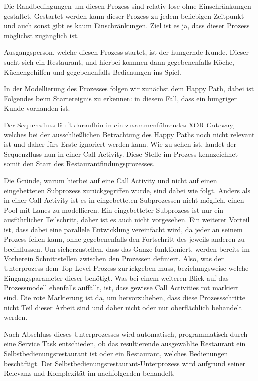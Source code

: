 Die Randbedingungen um diesen Prozess sind relativ lose ohne Einschränkungen gestaltet. Gestartet werden kann dieser Prozess zu jedem beliebigen Zeitpunkt und auch sonst gibt es kaum Einschränkungen. Ziel ist es ja, dass dieser Prozess möglichst zugänglich ist.

Ausgangsperson, welche diesen Prozess startet, ist der hungernde Kunde. Dieser sucht sich ein Restaurant, und hierbei kommen dann gegebenenfalls Köche, Küchengehilfen und gegebenenfalls Bedienungen ins Spiel. 


In der Modellierung des Prozesses folgen wir zunächst dem Happy Path, dabei ist Folgendes beim Startereignis zu erkennen: in diesem Fall, dass ein hungriger Kunde vorhanden ist.

Der Sequenzfluss läuft daraufhin in ein zusammenführendes XOR-Gateway, welches bei der ausschließlichen Betrachtung des Happy Paths noch nicht relevant ist und daher fürs Erste ignoriert werden kann. Wie zu sehen ist, landet der Sequenzfluss nun in einer Call Activity. Diese Stelle im Prozess kennzeichnet somit den Start des Restaurantfindungsprozesses.

Die Gründe, warum hierbei auf eine Call Activity und nicht auf einen eingebetteten Subprozess zurückgegriffen wurde, sind dabei wie folgt. Anders als in einer Call Activity ist es in eingebetteten Subprozessen nicht möglich, einen Pool mit Lanes zu modellieren. Ein eingebetteter Subprozess ist nur ein ausführlicher Teilschritt, daher ist es auch nicht vorgesehen. Ein weiterer Vorteil ist, dass dabei eine parallele Entwicklung vereinfacht wird, da jeder an seinem Prozess feilen kann, ohne gegebenenfalls den Fortschritt des jeweils anderen zu beeinflussen. Um sicherzustellen, dass das Ganze funktioniert, werden bereits im Vorherein Schnittstellen zwischen den Prozessen definiert. Also, was der Unterprozess dem Top-Level-Prozess zurückgeben muss, beziehungsweise welche Eingangsparameter dieser benötigt. Was bei einem weiteren Blick auf das Prozessmodell ebenfalls auffällt, ist, dass gewisse Call Activities rot markiert sind. Die rote Markierung ist da, um hervorzuheben, dass diese Prozessschritte nicht Teil dieser Arbeit sind und daher nicht oder nur oberflächlich behandelt werden.

Nach Abschluss dieses Unterprozesses wird automatisch, programmatisch durch eine Service Task entschieden, ob das resultierende ausgewählte Restaurant ein Selbstbedienungsrestaurant ist oder ein Restaurant, welches Bedienungen beschäftigt. Der Selbstbedienungsrestaurant-Unterprozess wird aufgrund seiner Relevanz und Komplexität im nachfolgenden  behandelt.


